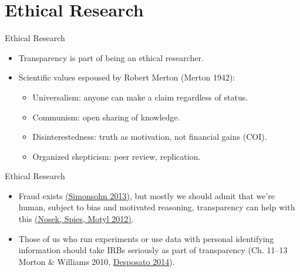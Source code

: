 \documentclass{beamer}
\begin{document}
{ %
    \begin{frame}[plain]
     \end{frame}
}
\section{Ethical Research}
\begin{frame}{Ethical Research}
\begin{itemize}
\item Transparency is part of being an ethical researcher. 

\item Scientific values espoused by Robert Merton (Merton 1942):
\begin{itemize}[<.->]
\item Universalism: anyone can make a claim regardless of status.
\item Communism: open sharing of knowledge.
\item Disinterestedness: truth as motivation, not financial gains (COI).
\item Organized skepticism: peer review, replication.
\end{itemize}
\end{itemize}
\end{frame}

\begin{frame}{Ethical Research}
\begin{itemize}
\item
Fraud exists \href{http://pss.sagepub.com/content/24/10/1875}{(Simonsohn 2013)}, but mostly we should admit that we're human, subject to bias and motivated reasoning, transparency can help with this \href{http://pps.sagepub.com/content/7/6/615.short}{(Nosek, Spies, Motyl 2012)}.
\item
Those of us who run experiments or use data with personal identifying information should take IRBs seriously as part of transparency (Ch. 11--13 Morton \& Williams 2010, \href{http://desposato.org/ethicsfieldexperiments.pdf}{Desposato 2014}). 
\end{itemize}
\end{frame}
\end{document}
